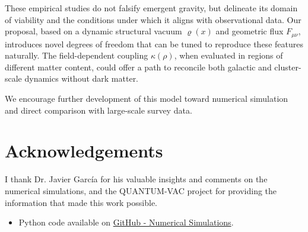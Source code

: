 \documentclass[twoside]{article}
\theoremstyle{definition}
\theoremstyle{remark}
\numberwithin{equation}{section}
\theoremstyle{definition}
\theoremstyle{example}
\theoremstyle{remark}
\numberwithin{equation}{section}%
\begin{document}
These empirical studies do not falsify emergent gravity, but delineate its domain of viability and the conditions under which it aligns with observational data. Our proposal, based on a dynamic structural vacuum \( \varrho(x) \) and geometric flux \( F_{\mu\nu} \), introduces novel degrees of freedom that can be tuned to reproduce these features naturally. The field-dependent coupling \( \kappa(\rho) \), when evaluated in regions of different matter content, could offer a path to reconcile both galactic and cluster-scale dynamics without dark matter.

We encourage further development of this model toward numerical simulation and direct comparison with large-scale survey data.
	
	
	
	
	\section*{Acknowledgements}
	I thank Dr. Javier García for his valuable insights and comments on the numerical simulations, and the QUANTUM-VAC project for providing the information that made this work possible.
	
\begin{itemize}
	\item Python code available on \href{https://github.com/KerymMacryn/VA-Theory/blob/main/codigo}{GitHub - Numerical Simulations}.
\end{itemize}	
		
\end{document}
